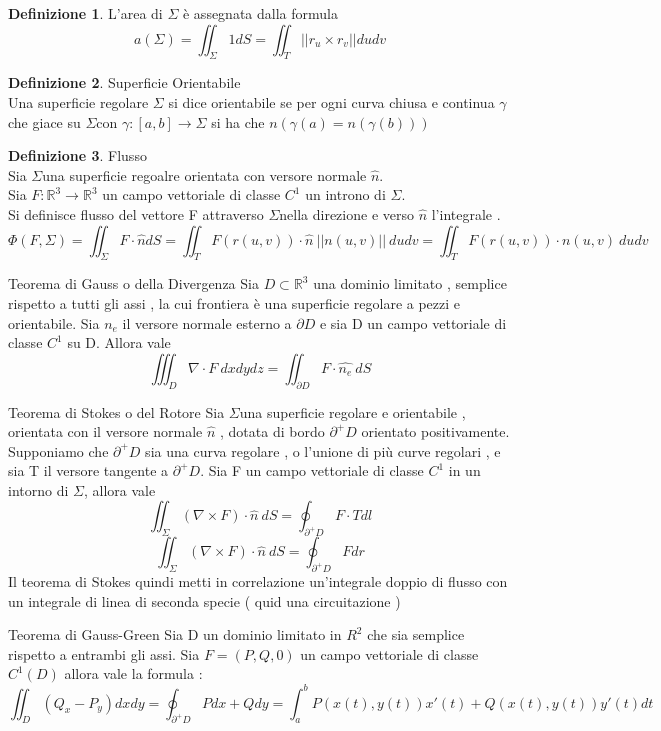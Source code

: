 \documentclass{article}
\theoremstyle{definition}
\newtheorem*{definizione}{Definizione}
\newcommand{\R}{\mathbb{R}}
\newcommand{\s}{$\Sigma$}
\begin{document}
\begin{definizione}
	L'area di $\Sigma$ è assegnata dalla formula 
	$$a(\Sigma)=\iint_{\Sigma}1 dS=\iint_T ||r_u \times r_v|| du dv$$
\end{definizione}
\begin{definizione}
	Superficie Orientabile \\
	Una superficie regolare $\Sigma$ si dice orientabile se per ogni curva chiusa e continua $\gamma$ che giace su \s con $\gamma : [a,b] \rightarrow \Sigma$ si ha che $n(\gamma (a)=n(\gamma(b)))$
\end{definizione}
\begin{definizione}
	Flusso \\
	Sia \s una superficie regoalre orientata con versore normale $\hat{n}$.\\Sia $ F : \R^3 \rightarrow \R^3$  un campo vettoriale di classe $C^1$ un introno di \s. \\ Si definisce flusso del vettore F attraverso \s nella direzione e verso $\hat{n}$ l'integrale .
	$$\Phi (F,	\Sigma)=\iint_{\Sigma} F \cdot \hat{n} dS=\iint_T F(r(u,v))\cdot \hat{n}\ ||n(u,v)|| \ d ud v=\iint_T F(r(u,v))\cdot n(u,v) \ d ud v$$
	
	\end{definizione}
\begin{teo}{Teorema di Gauss o della Divergenza}{}
   Sia $D \subset \R^3$ una dominio limitato , semplice rispetto a tutti gli assi , la cui frontiera è una superficie regolare a pezzi e orientabile. Sia $\hat{n_e}$ il versore normale esterno a $\partial D $ e sia D un campo vettoriale di classe $C^1$ su D. Allora vale $$\iiint_{D} \nabla \cdot  F \ dxdydz=\iint_{\partial D} F \cdot \hat{n_e} \ dS$$
\end{teo}
\begin{teo}{Teorema di Stokes o del Rotore }{}
	Sia \s una superficie regolare e orientabile , orientata con il versore normale \textbf{$\hat{n}$} , dotata di bordo $\partial^+ D$ orientato positivamente. \\Supponiamo che $\partial^+ D$ sia una curva regolare , o l'unione di più curve regolari , e sia T il versore tangente a $\partial^+ D$. Sia F un campo vettoriale di classe $C^1$ in un intorno di \s , allora vale $$\iint_{\Sigma} (\nabla \times F)\cdot \hat{n} \ dS=\oint_{\partial^+ D} F \cdot T dl$$ 
	$$\iint_{\Sigma} (\nabla \times F)\cdot \hat{n} \ dS=\oint_{\partial^+ D} F dr$$ 
	Il teorema di Stokes quindi metti in correlazione un'integrale doppio di flusso con un integrale di linea di seconda specie ( quid una circuitazione )
\end{teo}
\begin{teo}{Teorema di Gauss-Green}{}
	Sia D un dominio limitato in $R^2$ che sia semplice rispetto a entrambi gli assi. Sia $F=(P,Q,0)$ un campo vettoriale di classe $C^1(D)$ allora vale la formula : 
	$$\iint_D(Q_x-P_y)dxdy=\oint_{\partial^+ D}P dx + Q dy=\int_a^b P(x(t),y(t))x'(t)+Q(x(t),y(t))y'(t)dt$$
\end{teo}
\end{document}
